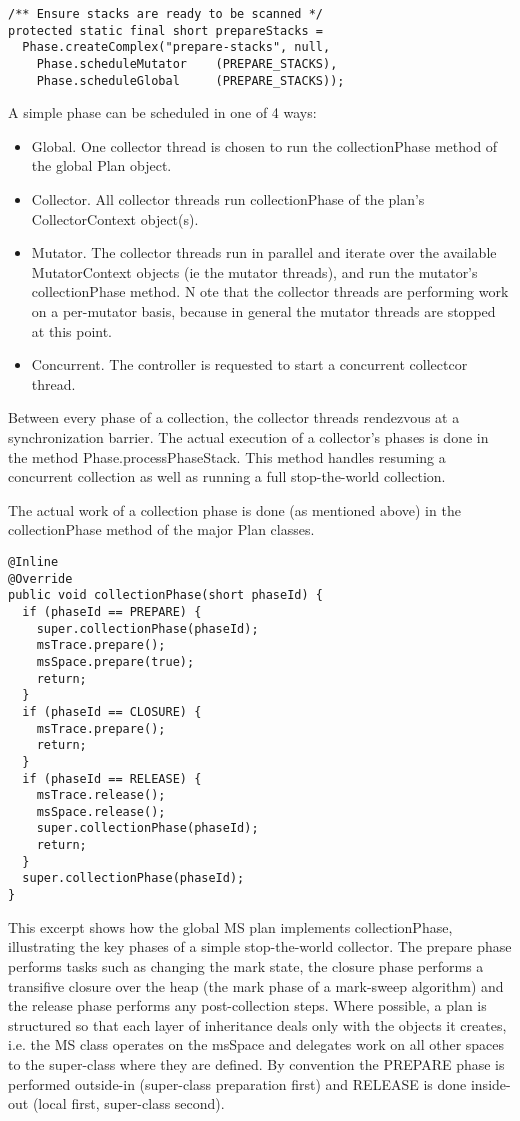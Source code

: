 \begin{lstlisting}[name=Simple.java,caption=\lstname: definition of a complex phase.,label=fig:gc:complexphase]
/** Ensure stacks are ready to be scanned */
protected static final short prepareStacks = 
  Phase.createComplex("prepare-stacks", null,
    Phase.scheduleMutator    (PREPARE_STACKS),
    Phase.scheduleGlobal     (PREPARE_STACKS));
\end{lstlisting}
A simple phase can be scheduled in one of 4 ways: 
\begin{itemize}
\item Global.  One collector thread is chosen to run the collectionPhase method
of the global Plan object.
\item Collector.  All collector threads run collectionPhase of the plan's
CollectorContext object(s).
\item Mutator.  The collector threads run in parallel and iterate over the
available MutatorContext objects (ie the mutator threads), 
and run the mutator's collectionPhase method.  N
ote that the collector threads are performing work on a per-mutator basis, 
because in general the mutator threads are stopped at this point.
\item Concurrent.  The controller is requested to start a concurrent collectcor
thread.
\end{itemize}
Between every phase of a collection, the collector threads rendezvous at a synchronization barrier.  The actual execution of a collector's phases is done in the method Phase.processPhaseStack.  This method handles resuming a concurrent collection as well as running a full stop-the-world collection.

The actual work of a collection phase is done (as mentioned above) in the collectionPhase method of the major Plan classes.

\begin{lstlisting}[name=MS.java,caption=\lstname: global \lstinline|collectionPhase|,label=fig:gc:ms-collectionphase]
@Inline
@Override
public void collectionPhase(short phaseId) {
  if (phaseId == PREPARE) {
    super.collectionPhase(phaseId);
    msTrace.prepare();
    msSpace.prepare(true);
    return;
  }
  if (phaseId == CLOSURE) {
    msTrace.prepare();
    return;
  }
  if (phaseId == RELEASE) {
    msTrace.release();
    msSpace.release();
    super.collectionPhase(phaseId);
    return;
  }
  super.collectionPhase(phaseId);
}
\end{lstlisting}
This excerpt shows how the global MS plan implements collectionPhase, 
illustrating the key phases of a simple stop-the-world collector.  
The prepare phase performs tasks such as changing the mark state, 
the closure phase performs a transifive closure over the heap 
(the mark phase of a mark-sweep algorithm) and the release phase 
performs any post-collection steps.  Where possible, a plan is 
structured so that each layer of inheritance deals only with the 
objects it creates, i.e. the MS class operates on the msSpace and 
delegates work on all other spaces to the super-class where they are defined.  
By convention the PREPARE phase is performed outside-in (super-class preparation first) 
and RELEASE is done inside-out (local first, super-class second).

